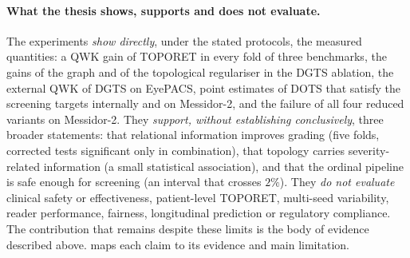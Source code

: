 \paragraph{What the thesis shows, supports and does not evaluate.}
The experiments \emph{show directly}, under the stated protocols, the measured quantities:
a QWK gain of TOPORET in every fold of three benchmarks, the gains of the graph and of the
topological regulariser in the DGTS ablation, the external QWK of DGTS on EyePACS, point
estimates of DOTS that satisfy the screening targets internally and on Messidor-2, and the
failure of all four reduced variants on Messidor-2. They \emph{support, without
establishing conclusively}, three broader statements: that relational information improves
grading (five folds, corrected tests significant only in combination), that topology
carries severity-related information (a small statistical association), and that the
ordinal pipeline is safe enough for screening (an interval that crosses $2\%$). They
\emph{do not evaluate} clinical safety or effectiveness, patient-level TOPORET, multi-seed
variability, reader performance, fairness, longitudinal prediction or regulatory
compliance. The contribution that remains despite these limits is the body of evidence described
above.  maps each claim
to its evidence and main limitation.

